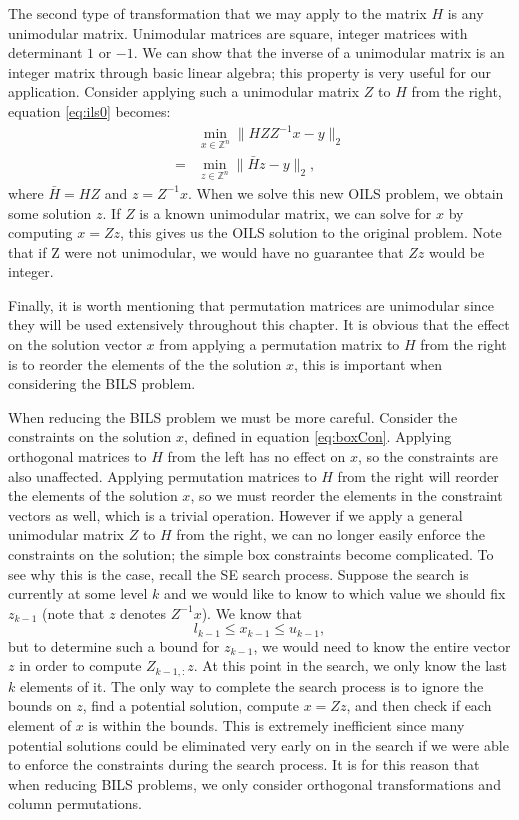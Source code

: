 \documentclass[12pt,Bold,letterpaper]{mcgilletdclass}
\begin{document}
The second type of transformation that we may apply to the matrix $H$ is any unimodular matrix. Unimodular matrices are square, integer matrices with determinant $1$ or $-1$. We can show that the inverse of a unimodular matrix is an integer matrix through basic linear algebra; this property is very useful for our application. Consider applying such a unimodular matrix $Z$ to $H$ from the right, equation \eqref{eq:ils0} becomes: 
\begin{align}
&\min_{x\in {\mathbb{Z}^n }}  \| HZZ^{-1}x - y \|_2\\
=&\min_{z\in {\mathbb{Z}^n }}  \| \bar{H}z - y \|_2,
\end{align}
where $\bar{H} = HZ$ and $z = Z^{-1}x$. When we solve this new OILS problem, we obtain some solution $z$. If $Z$ is a known unimodular matrix, we can solve for $x$ by computing $x = Zz$, this gives us the OILS solution to the original problem. Note that if Z were not unimodular, we would have no guarantee that $Zz$ would be integer.

Finally, it is worth mentioning that permutation matrices are unimodular since they will be used extensively throughout this chapter. It is obvious that the effect on the solution vector $x$ from applying a permutation matrix to $H$ from the right is to reorder the elements of the the solution $x$, this is important when considering the BILS problem.

When reducing the BILS problem we must be more careful. Consider the constraints on the solution $x$, defined in equation \eqref{eq:boxCon}. Applying orthogonal matrices to $H$ from the left has no effect on $x$, so the constraints are also unaffected. Applying permutation matrices to $H$ from the right will reorder the elements of the solution $x$, so we must reorder the elements in the constraint vectors as well, which is a trivial operation. However if we apply a general unimodular matrix $Z$ to $H$ from the right, we can no longer easily enforce the constraints on the solution; the simple box constraints become complicated. To see why this is the case, recall the SE search process. Suppose the search is currently at some level $k$ and we would like to know to which value we should fix $z_{k-1}$ (note that $z$ denotes $Z^{-1}x$). We know that $$l_{k-1} \le x_{k-1} \le u_{k-1},$$ but to determine such a bound for $z_{k-1}$, we would need to know the entire vector $z$ in order to compute $Z_{k-1,:}z$. At this point in the search, we only know the last $k$ elements of it. The only way to complete the search process is to ignore the bounds on $z$, find a potential solution, compute $x = Zz$, and then check if each element of $x$ is within the bounds. This is extremely inefficient since many potential solutions could be eliminated very early on in the search if we were able to enforce the constraints during the search process. It is for this reason that when reducing BILS problems, we only consider orthogonal transformations and column permutations.
\end{document}
